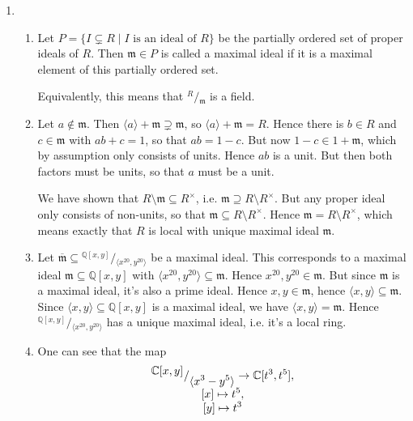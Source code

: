 \documentclass{article}
\newcommand\quotient[2]{{^{\displaystyle #1}}/{_{\displaystyle #2}}}
\begin{document}
\begin{enumerate}[style=nextline,label={Problem (\arabic*)}]
\item {
\begin{enumerate}[label={(\alph*)}]
\item {
Let $P = \{I \subsetneq R \mid I \text{ is an ideal of } R\}$ be the partially ordered set of proper ideals of $R$. Then $\mathfrak{m} \in P$ is called a maximal ideal if it is a maximal element of this partially ordered set.
\par
Equivalently, this means that $\quotient{R}{\mathfrak{m}}$ is a field.
}
\item {
Let $a \not\in \mathfrak{m}$. Then $\langle a \rangle + \mathfrak{m} \supsetneq \mathfrak{m}$, so $\langle a \rangle + \mathfrak{m} = R$. Hence there is $b \in R$ and $c \in \mathfrak{m}$ with $ab + c = 1$, so that $ab = 1 - c$. But now $1 - c \in 1 + \mathfrak{m}$, which by assumption only consists of units. Hence $ab$ is a unit. But then both factors must be units, so that $a$ must be a unit.
\par
We have shown that $R \setminus \mathfrak{m} \subseteq R^\times$, i.e. $\mathfrak{m} \supseteq R \setminus R^\times$. But any proper ideal only consists of non-units, so that $\mathfrak{m} \subseteq R \setminus R^\times$. Hence $\mathfrak{m} = R \setminus R^\times$, which means exactly that $R$ is local with unique maximal ideal $\mathfrak{m}$.
}
\item {
Let $\overline{\mathfrak{m}} \subseteq \quotient{\mathbb{Q}[x, y]}{\langle x^{20}, y^{20} \rangle}$ be a maximal ideal. This corresponds to a maximal ideal $\mathfrak{m} \subseteq \mathbb{Q}[x, y]$ with $\langle x^{20}, y^{20} \rangle \subseteq \mathfrak{m}$. Hence $x^{20}, y^{20} \in \mathfrak{m}$. But since $\mathfrak{m}$ is a maximal ideal, it's also a prime ideal. Hence $x, y \in \mathfrak{m}$, hence $\langle x, y \rangle \subseteq \mathfrak{m}$. Since $\langle x, y \rangle \subseteq \mathbb{Q}[x, y]$ is a maximal ideal, we have $\langle x, y \rangle = \mathfrak{m}$. Hence $\quotient{\mathbb{Q}[x, y]}{\langle x^{20}, y^{20} \rangle}$ has a unique maximal ideal, i.e. it's a local ring.
}
\item {
One can see that the map
\[
\begin{array}{>{\displaystyle}c}
\quotient{\mathbb{C}[x, y]}{\langle x^3 - y^5 \rangle} \to \mathbb{C}[t^3, t^5], \\ \relax
[x] \mapsto t^5, \\ \relax
[y] \mapsto t^3 \\

\end{array}\]}
\end{enumerate}}
\end{enumerate}
\end{document}
